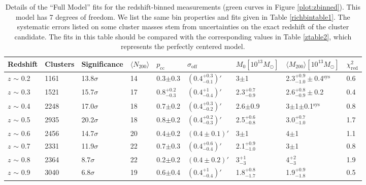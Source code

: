 \begin{landscape}
\begin{table}
\centering
    \caption[Shear Results for Redshift-Binned Clusters (Full Model)]{Details of the ``Full Model'' fits for the redshift-binned measurements (green curves in Figure \ref{plot:zbinned}). This model has 7 degrees of freedom. We list the same bin properties and fits given in Table \ref{richbintable1}. The systematic errors listed on some cluster masses stem from uncertainties on the exact redshift of the cluster candidate. The fits in this table should be compared with the corresponding values in Table \ref{ztable2}, which represents the perfectly centered model.}
    \begin{tabular}{lllllllll}
      \hline
      Redshift & Clusters & Significance & $\langle N_{200} \rangle$ & $p_{\mathrm{cc}}$ & $\sigma_{\mathrm{off}}$ & $M_0 \left[ 10^{13} M_{\odot}\right]$ & $\langle M_{200} \rangle \left[ 10^{13} M_{\odot}\right]$ & $\chi^2_{\mathrm{red}}$ \\ \hline
      $z$ $\sim$ 0.2 & 1161 & 13.8$\sigma$ & 14 & 0.3$\pm$0.3 & $(0.4^{+0.3}_{-0.1})'$ & 3$\pm$1 & 2.3$^{+0.9}_{-1.0}\pm$0.4$^{\mathrm{sys}}$ & 0.6 \\
      $z$ $\sim$ 0.3 & 1521 & 15.7$\sigma$ & 17 & 0.8$^{+0.2}_{-0.3}$ & $(0.4^{+1}_{-0.4})'$ & 2.3$^{+0.7}_{-0.9}$ & 2.6$^{+0.8}_{-0.9}\pm$0.2 & 0.4 \\
      $z$ $\sim$ 0.4 & 2248 & 17.0$\sigma$ & 18 & 0.7$\pm$0.2 & $(0.4^{+0.3}_{-0.2})'$ & 2.6$\pm$0.9 & 3$\pm$1$\pm$0.1$^{\mathrm{sys}}$ & 0.8 \\
      $z$ $\sim$ 0.5 & 2935 & 20.2$\sigma$ & 18 & 0.8$\pm$0.2 & $(0.4^{+0.2}_{-0.3})'$ & 2.5$^{+0.6}_{-0.8}$ & 3.0$^{+0.7}_{-1.0}$ & 1.7 \\
      $z$ $\sim$ 0.6 & 2456 & 14.7$\sigma$ & 20 & 0.4$\pm$0.2 & $(0.4\pm0.1)'$ & 3$\pm$1 & 4$\pm$1 & 1.1 \\
      $z$ $\sim$ 0.7 & 2331 & 11.9$\sigma$ & 22 & 0.7$\pm$0.3 & $(0.4^{+0.6}_{-0.4})'$ & 2.1$^{+0.9}_{-1.0}$ & 3$\pm$1 & 0.8 \\
      $z$ $\sim$ 0.8 & 2364 & 8.7$\sigma$ & 22 & 0.2$\pm$0.2 & $(0.4\pm0.2)'$ & 3$^{+1}_{-3}$ & 4$^{+2}_{-3}$ & 1.9 \\ 
      $z$ $\sim$ 0.9 & 3040 & 6.8$\sigma$ & 19 & 0.6$\pm$0.4 & $(0.4^{+1}_{-0.4})'$ & 1.8$^{+0.8}_{-1.7}$ & 1.9$^{+0.9}_{-1.8}$ & 0.5 \\
      \hline
    \end{tabular}
    \label{ztable1}
\end{table}


\end{landscape}
